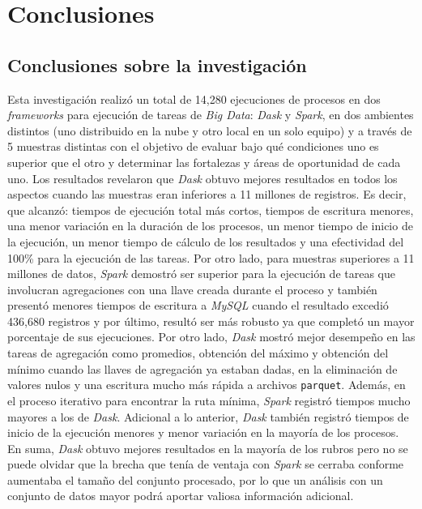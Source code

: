 \chapter*{Conclusiones}


\section{Conclusiones sobre la investigación}

Esta investigación realizó un total de 14,280 ejecuciones de procesos en dos \textit{frameworks} para ejecución de tareas de \textit{Big Data}: \textit{Dask} y \textit{Spark}, en dos ambientes distintos (uno distribuido en la nube y otro local en un solo equipo) y a través de 5 muestras distintas con el objetivo de evaluar bajo qué condiciones uno es superior que el otro y determinar las fortalezas y áreas de oportunidad de cada uno. Los resultados revelaron que \textit{Dask} obtuvo mejores resultados en todos los aspectos cuando las muestras eran inferiores a 11 millones de registros. Es decir, que alcanzó: tiempos de ejecución total más cortos, tiempos de escritura menores, una menor variación en la duración de los procesos, un menor tiempo de inicio de la ejecución, un menor tiempo de cálculo de los resultados y una efectividad del 100\% para la ejecución de las tareas. Por otro lado, para muestras superiores a 11 millones de datos, \textit{Spark} demostró ser superior para la ejecución de tareas que involucran agregaciones con una llave creada durante el proceso y también presentó menores tiempos de escritura a \textit{MySQL} cuando el resultado excedió 436,680 registros y por último, resultó ser más robusto ya que completó un mayor porcentaje de sus ejecuciones. Por otro lado, \textit{Dask} mostró mejor desempeño en las tareas de agregación como promedios, obtención del máximo y obtención del mínimo cuando las llaves de agregación ya estaban dadas, en la eliminación de valores nulos y una escritura mucho más rápida a archivos \texttt{parquet}. Además, en el proceso iterativo para encontrar la ruta mínima, \textit{Spark} registró tiempos mucho mayores a los de \textit{Dask}. Adicional a lo anterior, \textit{Dask} también registró tiempos de inicio de la ejecución menores y menor variación en la mayoría de los procesos.  En suma, \textit{Dask} obtuvo mejores resultados en la mayoría de los rubros pero no se puede olvidar que la brecha que tenía de ventaja con \textit{Spark} se cerraba conforme aumentaba el tamaño del conjunto procesado, por lo que un análisis con un conjunto de datos mayor podrá aportar valiosa información adicional.

